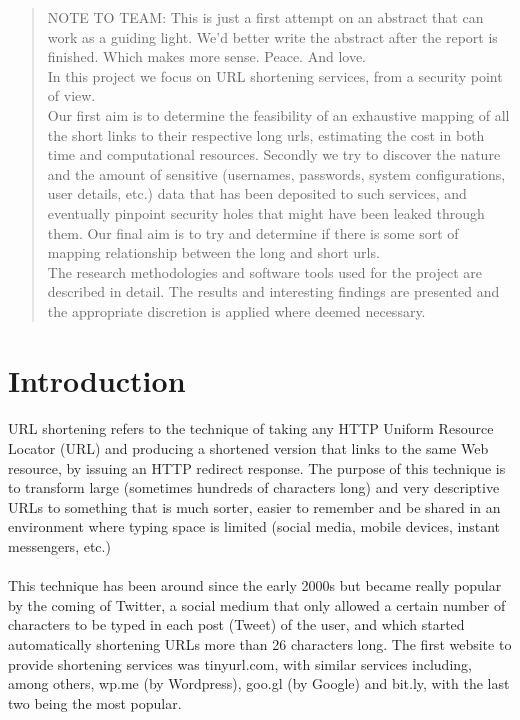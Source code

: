 \documentclass[12pt]{article}
\begin{document}
\begin{abstract}

\noindent
NOTE TO TEAM: This is just a first attempt on an abstract that can work as a guiding light. We'd better write the abstract after the report is finished. Which makes more sense. Peace. And love. \\[0.5cm]
In this project we focus on URL shortening services, from a security point of view.\\ Our first aim is to determine the feasibility of an exhaustive mapping of all the short links to their respective long urls, estimating the cost in both time and computational resources. Secondly we try to discover the nature and the amount of sensitive (usernames, passwords, system configurations, user details, etc.) data that has been deposited to such services, and eventually pinpoint security holes that might have been leaked through them. Our final aim is to try and determine if there is some sort of mapping relationship between the long and short urls. \\
The research methodologies and software tools used for the project are described in detail. The results and interesting findings are presented and the appropriate discretion is applied where deemed necessary. 


\end{abstract}
\newpage

%
\section{Introduction}

%
\paragraph{}
URL shortening refers to the technique of taking any HTTP Uniform Resource Locator (URL) and producing a shortened version that links to the same Web resource, by issuing an HTTP redirect response. The purpose of this technique is to transform large (sometimes hundreds of characters long) and very descriptive URLs to something that is much sorter, easier to remember and be shared in an environment where typing space is limited (social media, mobile devices, instant messengers, etc.)
\paragraph{}
This technique has been around since the early 2000s but became really popular by the coming of Twitter, a social medium that only allowed a certain number of characters to be typed in each post (Tweet) of the user, and which started automatically shortening URLs more than 26 characters long. The first website to provide shortening services was tinyurl.com, with similar services including, among others, wp.me (by Wordpress), goo.gl (by Google) and bit.ly, with the last two being the most popular. 
\end{document}
